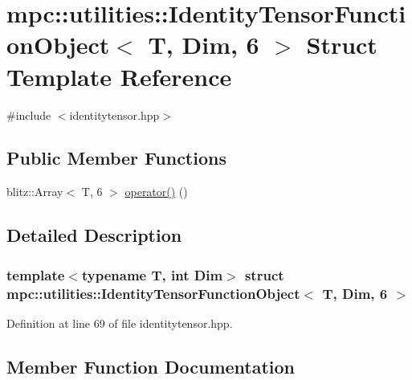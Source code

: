 \hypertarget{structmpc_1_1utilities_1_1_identity_tensor_function_object_3_01_t_00_01_dim_00_016_01_4}{}\section{mpc\+:\+:utilities\+:\+:Identity\+Tensor\+Function\+Object$<$ T, Dim, 6 $>$ Struct Template Reference}
\label{structmpc_1_1utilities_1_1_identity_tensor_function_object_3_01_t_00_01_dim_00_016_01_4}


{\ttfamily \#include $<$identitytensor.\+hpp$>$}

\subsection*{Public Member Functions}
\begin{DoxyCompactItemize}
\item 
blitz\+::\+Array$<$ T, 6 $>$ \mbox{\hyperlink{structmpc_1_1utilities_1_1_identity_tensor_function_object_3_01_t_00_01_dim_00_016_01_4_a05d96d47de8c1ab188e8978732a2a852}{operator()}} ()
\end{DoxyCompactItemize}


\subsection{Detailed Description}
\subsubsection*{template$<$typename T, int Dim$>$\newline
struct mpc\+::utilities\+::\+Identity\+Tensor\+Function\+Object$<$ T, Dim, 6 $>$}



Definition at line 69 of file identitytensor.\+hpp.



\subsection{Member Function Documentation}
\mbox{\label{structmpc_1_1utilities_1_1_identity_tensor_function_object_3_01_t_00_01_dim_00_016_01_4_a05d96d47de8c1ab188e8978732a2a852}} 
